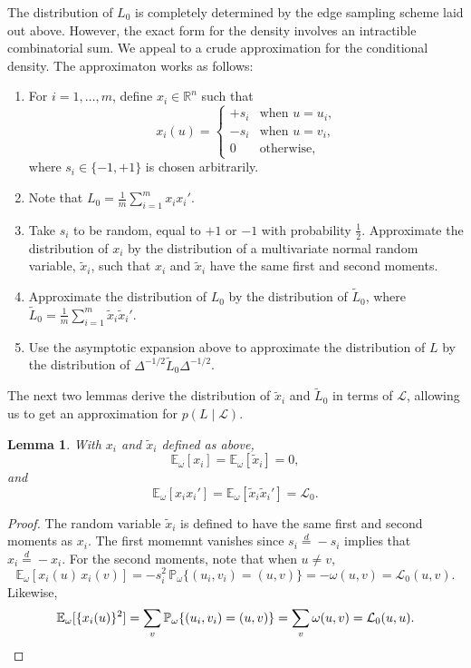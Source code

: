 \documentclass[12pt]{article}
\newcommand{\reals}{\mathbb{R}}
\newcommand{\prob}{\mathbb{P}}
\newcommand{\E}{\mathbb{E}}
\theoremstyle{plain}
\newtheorem{lemma}[theorem]{Lemma}
\begin{document}
The distribution of $L_0$ is completely determined by the edge
sampling scheme laid out above.  However, the exact form for the
density involves an intractible combinatorial sum.  We appeal to a
crude approximation for the conditional density.
The approximaton works as follows:
\begin{enumerate}
\item For $i = 1, \dotsc, m$, define $x_i \in \reals^n$ such that
  \[
    x_i(u)
      =
      \begin{cases}
        +s_i &\text{when $u = u_i$,} \\
        -s_i &\text{when $u = v_i$,} \\
        0 &\text{otherwise,}
      \end{cases}
  \]
  where $s_i \in \{ -1, +1 \}$ is chosen arbitrarily.
\item Note that $L_0 = \frac{1}{m} \sum_{i=1}^m x_i x_i'$.
\item Take $s_i$ to be random, equal to $+1$ or $-1$ with probability
  $\tfrac{1}{2}$.  Approximate the distribution of $x_i$ by the
  distribution of a multivariate normal random variable, $\tilde x_i$,
  such that $x_i$ and $\tilde x_i$ have the same first and second
  moments.
\item Approximate the distribution of $L_0$ by the distribution of $\tilde L_0$, where
  \(
  \tilde L_0 = \frac{1}{m} \sum_{i=1}^m \tilde x_i \tilde x_i'.
  \)
  \item Use the asymptotic expansion above to approximate the
    distribution of $L$ by the distribution of
    $\Delta^{-1/2} \tilde L_0 \Delta^{-1/2}$.
\end{enumerate}

\noindent
The next two lemmas derive the distribution of $\tilde x_i$ and
$\tilde L_0$ in terms of $\mathcal{L}$, allowing us to get an
approximation for $p(L \mid \mathcal{L})$.

\begin{lemma}
  With $x_i$ and $\tilde x_i$ defined as above,
  \[
    \E_\omega[ x_i ] = \E_\omega[ \tilde x_i ] = 0,
  \]
  and
  \[
    \E_\omega[ x_i x_i' ] = \E_\omega [ \tilde x_i \tilde x_i' ] = \mathcal{L}_0.
  \]
\end{lemma}
\begin{proof}
The random variable $\tilde x_i$ is defined to have the same first
and second moments as $x_i$.
The first momemnt vanishes since $s_i \overset{d}{=} -s_i$ implies
that $x_i \overset{d}{=} -x_i$.  For the second moments, note that
when $u \neq v$, 
\[
  \E_\omega[x_i(u) \, x_i(v)]
  = -s_i^2 \, \prob_\omega\{ (u_i,v_i) = (u,v) \}  = -\omega(u,v)
  = \mathcal{L}_0(u,v).
\]
Likewise,
\[
  \E_\omega[\{x_i(u)\}^2]
      = \sum_{v} \prob_\omega\{ (u_i,v_i) = (u,v) \}
      = \sum_{v} \omega(u,v)
      = \mathcal{L}_0(u,u). \qedhere
\]
\end{proof}
\end{document}

